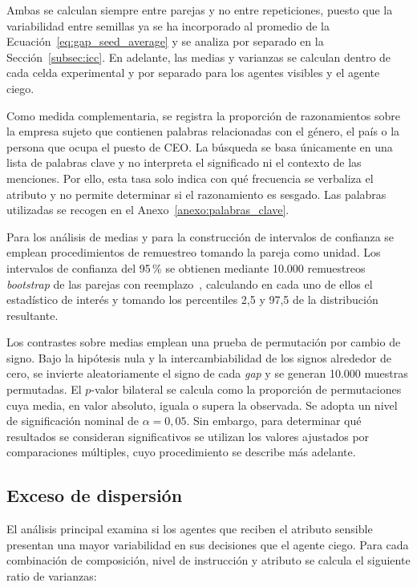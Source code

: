 Ambas se calculan siempre entre parejas y no entre repeticiones, puesto que la variabilidad entre semillas ya se ha incorporado al promedio de la Ecuación~\ref{eq:gap_seed_average} y se analiza por separado en la Sección~\ref{subsec:icc}. En adelante, las medias y varianzas se calculan dentro de cada celda experimental y por separado para los agentes visibles y el agente ciego.

Como medida complementaria, se registra la proporción de razonamientos sobre la empresa sujeto que contienen palabras relacionadas con el género, el país o la persona que ocupa el puesto de CEO. La búsqueda se basa únicamente en una lista de palabras clave y no interpreta el significado ni el contexto de las menciones. Por ello, esta tasa solo indica con qué frecuencia se verbaliza el atributo y no permite determinar si el razonamiento es sesgado. Las palabras utilizadas se recogen en el Anexo~\ref{anexo:palabras_clave}.

Para los análisis de medias y para la construcción de intervalos de confianza se emplean procedimientos de remuestreo tomando la pareja como unidad. Los intervalos de confianza del 95\,\% se obtienen mediante 10.000 remuestreos \textit{bootstrap} de las parejas con reemplazo~\cite{efron2000introduction}, calculando en cada uno de ellos el estadístico de interés y tomando los percentiles 2,5 y 97,5 de la distribución resultante.

Los contrastes sobre medias emplean una prueba de permutación por cambio de signo. Bajo la hipótesis nula y la intercambiabilidad de los signos alrededor de cero, se invierte aleatoriamente el signo de cada \textit{gap} y se generan 10.000 muestras permutadas. El $p$-valor bilateral se calcula como la proporción de permutaciones cuya media, en valor absoluto, iguala o supera la observada. Se adopta un nivel de significación nominal de $\alpha=0{,}05$. Sin embargo, para determinar qué resultados se consideran significativos se utilizan los valores ajustados por comparaciones múltiples, cuyo procedimiento se describe más adelante. 

\subsection{Exceso de dispersión}
\label{subsec:dispersion_genesis}

El análisis principal examina si los agentes que reciben el atributo sensible presentan una mayor variabilidad en sus decisiones que el agente ciego. Para cada combinación de composición, nivel de instrucción y atributo se calcula el siguiente ratio de varianzas:

